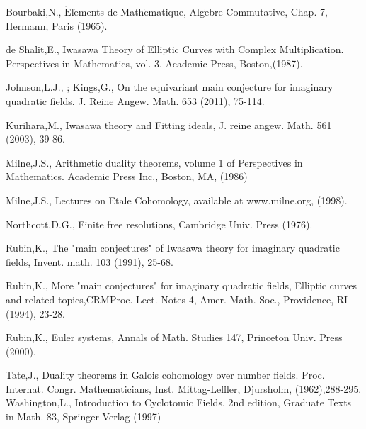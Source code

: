 \documentclass{ujarticle}
\begin{document}
\begin{thebibliography}{a99}

\bibitem[Bourbaki]{} Bourbaki,N., $\mathrm{\acute{E}}$l$\mathrm{\acute{e}}$ments de Math$\mathrm{\acute{e}}$matique, Alg$\mathrm{\grave{e}}$bre Commutative, Chap. 7, Hermann, Paris (1965).

     de Shalit,E., Iwasawa Theory of Elliptic Curves with Complex Multiplication. Perspectives in Mathematics, vol. 3, Academic Press, Boston,(1987).

     Johnson,L.J., ; Kings,G., On the equivariant main conjecture for imaginary quadratic fields.
J. Reine Angew. Math. 653 (2011), 75-114.

 Kurihara,M., Iwasawa theory and Fitting ideals, J. reine angew. Math. 561 (2003), 39-86.



   Milne,J.S., Arithmetic duality theorems, volume 1 of Perspectives in Mathematics.
Academic Press Inc., Boston, MA, (1986)

   Milne,J.S., Lectures on Etale Cohomology, available at www.milne.org, (1998).

 Northcott,D.G., Finite free resolutions, Cambridge Univ. Press (1976).

     Rubin,K., The  "main conjectures"  of Iwasawa theory for imaginary quadratic fields, Invent.
math. 103 (1991), 25-68.

   Rubin,K., More  "main conjectures" for imaginary quadratic fields, Elliptic curves and related
topics,CRMProc. Lect. Notes 4, Amer. Math. Soc., Providence, RI (1994), 23-28.

   Rubin,K., Euler systems, Annals of Math. Studies 147, Princeton Univ. Press (2000).

   Tate,J., Duality theorems in Galois cohomology over number fields.  Proc. Internat.
Congr. Mathematicians,  Inst. Mittag-Leffler, Djursholm, (1962),288-295.
   Washington,L., Introduction to Cyclotomic Fields, 2nd edition, Graduate Texts in Math. 83, Springer-Verlag (1997)
\end{thebibliography}
\end{document}
